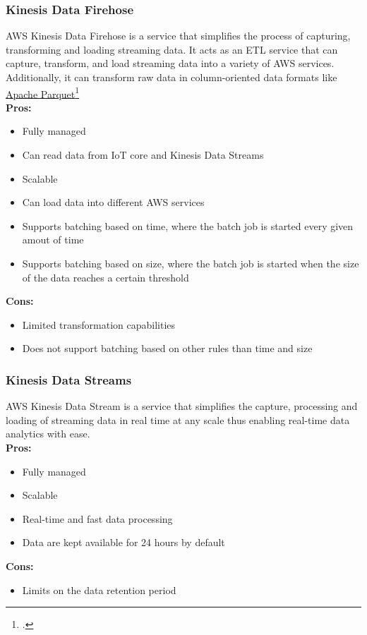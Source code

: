         \subsubsection{Kinesis Data Firehose}
        \label{aws:kinesis-data-firehose}
 AWS Kinesis Data Firehose is a service that simplifies the process of capturing, transforming and loading streaming data.
 It acts as an ETL service that can capture, transform, and load streaming data into a variety of AWS services.
 Additionally, it can transform raw data in column-oriented data formats like \href{https://parquet.apache.org/}{Apache Parquet}\footcite{site:apache-parquet}\\
        \textbf{Pros:}
        \begin{itemize}
            \item Fully managed
            \item Can read data from IoT core and Kinesis Data Streams
            \item Scalable
            \item Can load data into different AWS services
            \item Supports batching based on time, where the batch job is started every given amout of time
            \item Supports batching based on size, where the batch job is started when the size of the data reaches a certain threshold
        \end{itemize}
        \textbf{Cons:}
        \begin{itemize}
            \item Limited transformation capabilities
            \item Does not support batching based on other rules than time and size
        \end{itemize}
        
        \subsubsection{Kinesis Data Streams} 
        \label{aws:kinesis-data-streams}
 AWS Kinesis Data Stream is a service that simplifies the capture,
 processing and loading of streaming data in real time at any scale thus enabling real-time data analytics with ease.\\
        \textbf{Pros:}
        \begin{itemize}
            \item Fully managed
            \item Scalable
            \item Real-time and fast data processing
            \item Data are kept available for 24 hours by default
        \end{itemize}
        \textbf{Cons:}
        \begin{itemize}
            \item Limits on the data retention period
        \end{itemize}

